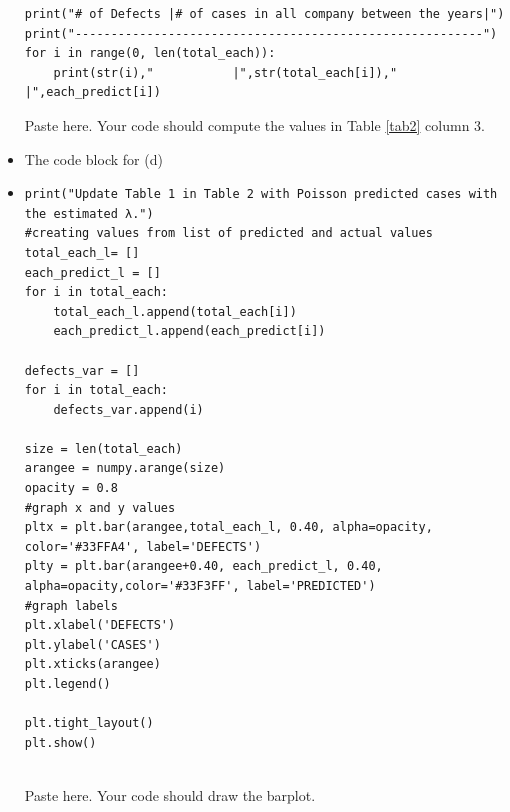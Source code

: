 \documentclass[a4 paper]{article}
\numberwithin{equation}{section}
\newcommand{\0}{\mathbf{0}}
\begin{document}
\begin{itemize}
{\begin{lstlisting}
print("# of Defects |# of cases in all company between the years|")
print("---------------------------------------------------------")
for i in range(0, len(total_each)):
    print(str(i),"           |",str(total_each[i]),"       |",each_predict[i])
		  \end{lstlisting}
		  }
		Paste here. Your code should compute the values in Table \ref{tab2} column 3. 
		\item The code block for (d)\\
		\item{
		  \begin{lstlisting}
print("Update Table 1 in Table 2 with Poisson predicted cases with the estimated λ.")
#creating values from list of predicted and actual values
total_each_l= []
each_predict_l = []
for i in total_each:
    total_each_l.append(total_each[i])
    each_predict_l.append(each_predict[i])

defects_var = []
for i in total_each:
    defects_var.append(i)

size = len(total_each)
arangee = numpy.arange(size)
opacity = 0.8
#graph x and y values
pltx = plt.bar(arangee,total_each_l, 0.40, alpha=opacity, color='#33FFA4', label='DEFECTS')
plty = plt.bar(arangee+0.40, each_predict_l, 0.40, alpha=opacity,color='#33F3FF', label='PREDICTED')
#graph labels
plt.xlabel('DEFECTS')
plt.ylabel('CASES')
plt.xticks(arangee)
plt.legend()

plt.tight_layout()
plt.show()


		  \end{lstlisting}
		  }
		Paste here. Your code should draw the barplot.
	\end{itemize}
	
	
	
	
\end{document}

